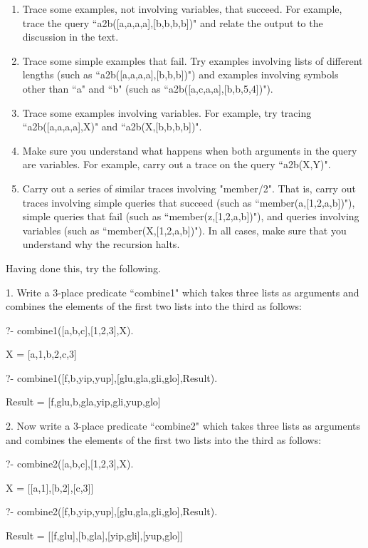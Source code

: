 \begin{enumerate}
\item{}Trace some examples, not involving variables, that succeed. For
example, trace the query ``a2b([a,a,a,a],[b,b,b,b])" and relate the
output to the discussion in the text.
\item{}Trace some simple examples that fail. Try
examples involving  lists of different lengths
(such as ``a2b([a,a,a,a],[b,b,b])") and
examples involving  symbols other than ``a" and ``b"
(such as ``a2b([a,c,a,a],[b,b,5,4])").
\item{}Trace some examples involving variables. For example, try
tracing ``a2b([a,a,a,a],X)" and ``a2b(X,[b,b,b,b])".
\item{}Make sure you understand what happens when
both arguments in the query are variables. For example, carry
out a trace on the query ``a2b(X,Y)".
\item{}Carry out a series of similar traces involving
"member/2". That is, carry out traces involving simple queries that
succeed (such as ``member(a,[1,2,a,b])"), simple queries that fail
(such as ``member(z,[1,2,a,b])"), and queries involving variables
(such as ``member(X,[1,2,a,b])").  In all cases, make sure that
you understand why the recursion halts.
\end{enumerate}


Having done this, try the following.


1. Write a 3-place predicate ``combine1" which takes three
lists as arguments and combines the elements of the first two lists
into the third as follows:
\begin{LPNcodedisplay}
?- combine1([a,b,c],[1,2,3],X).

X = [a,1,b,2,c,3]

?- combine1([f,b,yip,yup],[glu,gla,gli,glo],Result).

Result = [f,glu,b,gla,yip,gli,yup,glo]
\end{LPNcodedisplay}

2. Now write a 3-place predicate ``combine2" which takes three
lists as arguments and combines the elements of the first two lists
into the third as follows:
\begin{LPNcodedisplay}
?- combine2([a,b,c],[1,2,3],X).

X = [[a,1],[b,2],[c,3]]

?- combine2([f,b,yip,yup],[glu,gla,gli,glo],Result).

Result = [[f,glu],[b,gla],[yip,gli],[yup,glo]]
\end{LPNcodedisplay}

